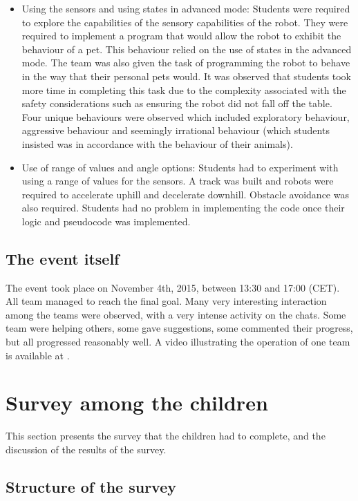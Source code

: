 \documentclass{intech-journal}
\begin{document}
\begin{itemize}
\item Using the sensors and using states in advanced mode: Students were required to explore the capabilities of the sensory capabilities of the robot. 
They were required to implement a program that would allow the robot to exhibit the behaviour of a pet. 
This behaviour relied on the use of states in the advanced mode. 
The team was also given the task of programming the robot to behave in the way that their personal pets would.  
It was observed that students took more time in completing this task due to the complexity associated with the safety considerations such as ensuring the robot did not fall off the table. 
Four unique behaviours were observed which included exploratory behaviour, aggressive behaviour and seemingly irrational behaviour (which students insisted was in accordance with the behaviour of their animals).
\item Use of range of values and angle options: Students had to experiment with using a range of values for the sensors.
A track was built and robots were required to accelerate uphill and decelerate downhill. 
Obstacle avoidance was also required.
Students had no problem in implementing the code once their logic and pseudocode was implemented.
\end{itemize}

\subsection{The event itself}

The event took place on November 4th, 2015, between 13:30 and 17:00 (CET).
All team managed to reach the final goal.
Many very interesting interaction among the teams were observed, with a very intense activity on the chats.
Some team were helping others, some gave suggestions, some commented their progress, but all progressed reasonably well.
A video illustrating the operation of one team is available at \cite{SwissinfoR2T2}.

\section{Survey among the children}

This section presents the survey that the children had to complete, and the discussion of the results of the survey. 

\subsection{Structure of the survey}
\end{document}
